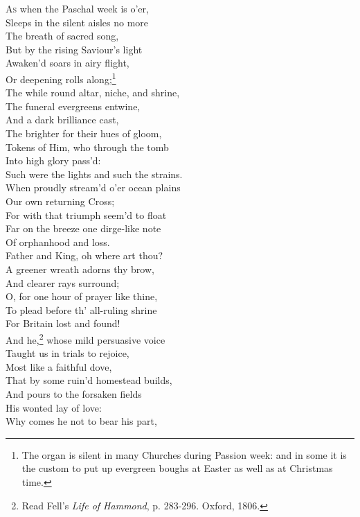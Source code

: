 \textsc{As} when the Paschal week is o’er, \\
 Sleeps in the silent aisles no more \\
 The breath of sacred song, \\
 But by the rising Saviour’s light \\
 Awaken’d soars in airy flight, \\
 Or deepening rolls along;\footnote{The organ is silent in many Churches during Passion week: and in some it is the custom to put up evergreen boughs at Easter as well as at Christmas time.} \\
  The while round altar, niche, and shrine, \\
 The funeral evergreens entwine, \\
 And a dark brilliance cast, \\
 The brighter for their hues of gloom, \\
 Tokens of Him, who through the tomb \\
 Into high glory pass’d: \\
  Such were the lights and such the strains. \\
 When proudly stream’d o’er ocean plains \\
 Our own returning Cross; \\
 For with that triumph seem’d to float \\
 Far on the breeze one dirge-like note \\
 Of orphanhood and loss. \\
  Father and King, oh where art thou? \\
 A greener wreath adorns thy brow, \\
 And clearer rays surround; \\
 O, for one hour of prayer like thine, \\
 To plead before th’ all-ruling shrine \\
 For Britain lost and found! \\
  And he,\footnote{Read Fell’s \emph{Life of Hammond}, p. 283-296. Oxford, 1806.} whose mild persuasive voice \\
 Taught us in trials to rejoice, \\
 Most like a faithful dove, \\
 That by some ruin’d homestead builds, \\
 And pours to the forsaken fields \\
 His wonted lay of love: \\
  Why comes he not to bear his part, \\

